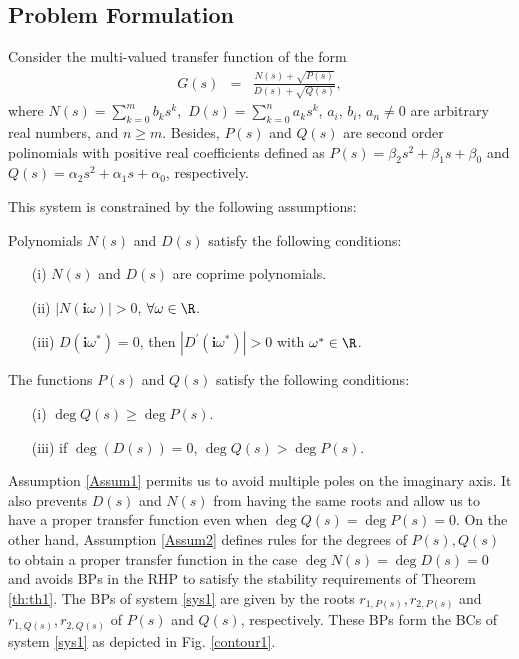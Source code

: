 \documentclass[twoside,reqno,11pt]{fcaa-var} %
\begin{document}
\subsection{Problem Formulation}
Consider the multi-valued transfer function of the form
\begin{eqnarray}
G(s)&=&\frac{N(s)+\sqrt{P(s)}}{D(s)+\sqrt{Q(s)}}, \label{sys1}
\end{eqnarray}
where $N(s)=\sum_{k=0}^{m}b_ks^k,$ $D(s)=\sum_{k=0}^{n}a_ks^k$, $a_i$, $b_i$, $a_n\neq0$ are arbitrary real numbers, and $n\geq m$. Besides, $P(s)$ and $Q(s)$ are second order polinomials with positive real coefficients defined as $P(s)=\beta_2s^2+\beta_1 s+\beta_0$ and $Q(s)=\alpha_2s^2+\alpha_1 s+\alpha_0$, respectively.\par 
This system is constrained by the following assumptions:
\begin{assumption}\label{Assum1}
	Polynomials $N(s)$ and $D(s)$ satisfy the following conditions:
	\begin{itemize}
		\item [(i)] $N(s)$ and $D(s)$ are coprime polynomials.
		\item [(ii)] $|N(\bm{i}\omega)|>0$, $\forall\omega\in\R$.
		\item [(iii)] $D(\bm{i}\omega^*)=0$, then $|D^\prime(\bm{i}\omega^*)|>0$ with $\omega^*\in\R$.
	\end{itemize}
\end{assumption}
\begin{assumption}\label{Assum2}
	The functions $P(s)$ and $Q(s)$ satisfy the following conditions:
	\begin{itemize}
		\item  [(i)] $\deg Q(s) \geq \deg P(s)$.
		\item [(iii)] if $\deg(D(s))=0$, $\deg Q(s) > \deg P(s)$.
	\end{itemize}
\end{assumption}
Assumption \ref{Assum1} permits us to avoid multiple poles on the imaginary axis. It also prevents $D(s)$ and $N(s)$ from having the same roots and allow us to have a proper transfer function even when $\deg Q(s)=\deg P(s)=0$. On the other hand, Assumption \ref{Assum2} defines rules for the degrees of $P(s),Q(s)$ to obtain a proper transfer function in the case  $\deg N(s)=\deg D(s)=0$ and avoids BPs in the RHP to satisfy the stability requirements of Theorem \ref{th:th1}. The BPs of system \eqref{sys1} are given by the roots $r_{1,P(s)},r_{2,P(s)}$ and $r_{1,Q(s)},r_{2,Q(s)}$ of $P(s)$ and $Q(s)$, respectively. These BPs form the BCs of system \eqref{sys1} as depicted in Fig. \ref{contour1}.\par
\end{document}

